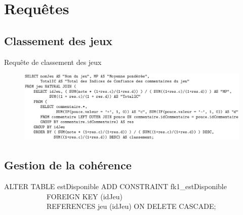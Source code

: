 \documentclass{beamer}
\begin{document}
\section{Requêtes}
\subsection{Classement des jeux}
\begin{frame}
\begin{block}{Requête de classement des jeux}
\begin{center}
\begin{figure}[t]
  \includegraphics[scale=0.3]{requete.png}
\end{figure}
\end{center}
\end{block}
\end{frame}

\subsection{Gestion de la cohérence}
\begin{frame}
ALTER TABLE estDisponible ADD CONSTRAINT fk1\_estDisponible \\
\ \ \ \ \ \ \ \ \ \ \ \ FOREIGN KEY (idJeu) \\
\ \ \ \ \ \ \ \ \ \ \ \ REFERENCES jeu (idJeu) ON DELETE CASCADE;
\end{frame}
\end{document}
